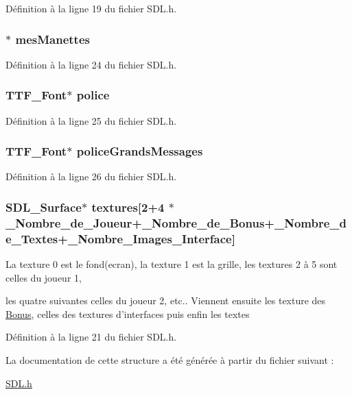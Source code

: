 Définition à la ligne 19 du fichier S\-D\-L.\-h.

\hypertarget{struct_s_d_l_ab0b0a871f5eb61c1171d679a7e568590}{
\subsubsection[{mes\-Manettes}]{$\ast$ mes\-Manettes}}\label{struct_s_d_l_ab0b0a871f5eb61c1171d679a7e568590}


Définition à la ligne 24 du fichier S\-D\-L.\-h.

\hypertarget{struct_s_d_l_a49a11b0728728090fa1189391c9fe0c8}{
\subsubsection[{police}]{\setlength{\rightskip}{0pt plus 5cm}T\-T\-F\-\_\-\-Font$\ast$ police}}\label{struct_s_d_l_a49a11b0728728090fa1189391c9fe0c8}


Définition à la ligne 25 du fichier S\-D\-L.\-h.

\hypertarget{struct_s_d_l_a1086358a0d3bf9a044e55f9946bbb869}{
\subsubsection[{police\-Grands\-Messages}]{\setlength{\rightskip}{0pt plus 5cm}T\-T\-F\-\_\-\-Font$\ast$ police\-Grands\-Messages}}\label{struct_s_d_l_a1086358a0d3bf9a044e55f9946bbb869}


Définition à la ligne 26 du fichier S\-D\-L.\-h.

\hypertarget{struct_s_d_l_af2ecb76ea798efcbd83469418abffe48}{
\subsubsection[{textures}]{\setlength{\rightskip}{0pt plus 5cm}S\-D\-L\-\_\-\-Surface$\ast$ textures\mbox{[}2+4 $\ast${\bf \-\_\-\-Nombre\-\_\-de\-\_\-\-Joueur}+{\bf \-\_\-\-Nombre\-\_\-de\-\_\-\-Bonus}+{\bf \-\_\-\-Nombre\-\_\-de\-\_\-\-Textes}+{\bf \-\_\-\-Nombre\-\_\-\-Images\-\_\-\-Interface}\mbox{]}}}\label{struct_s_d_l_af2ecb76ea798efcbd83469418abffe48}
\begin{DoxyVerb} La texture 0 est le fond(ecran), la texture 1 est la grille, les textures 2 à 5 sont celles du joueur 1,
\end{DoxyVerb}
 les quatre suivantes celles du joueur 2, etc.. Viennent ensuite les texture des \hyperlink{struct_bonus}{Bonus}, celles des textures d'interfaces puis enfin les textes 

Définition à la ligne 21 du fichier S\-D\-L.\-h.



La documentation de cette structure a été générée à partir du fichier suivant \-:\begin{DoxyCompactItemize}
\item 
\hyperlink{_s_d_l_8h}{S\-D\-L.\-h}\end{DoxyCompactItemize}
